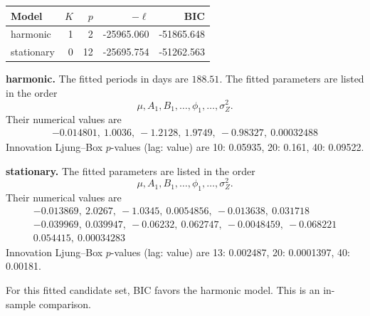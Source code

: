 \begin{center}\begin{tabular}{lrrrr}
Model & $K$ & $p$ & $-\ell$ & BIC\\\hline
harmonic & 1 & 2 & -25965.060 & -51865.648\\
stationary & 0 & 12 & -25695.754 & -51262.563\\
\end{tabular}\end{center}
\noindent\textbf{harmonic.} 
The fitted periods in days are $188.51$. 
The fitted parameters are listed in the order
\[\mu,A_1,B_1,\ldots,\phi_1,\ldots,\sigma_Z^2.\]
Their numerical values are
\[\begin{gathered}-0.014801,\ 1.0036,\ -1.2128,\ 1.9749,\ -0.98327,\ 0.00032488\end{gathered}\]
Innovation Ljung--Box $p$-values (lag: value) are 10: 0.05935, 20: 0.161, 40: 0.09522.\par
\noindent\textbf{stationary.} 
The fitted parameters are listed in the order
\[\mu,A_1,B_1,\ldots,\phi_1,\ldots,\sigma_Z^2.\]
Their numerical values are
\[\begin{gathered}-0.013869,\ 2.0267,\ -1.0345,\ 0.0054856,\ -0.013638,\ 0.031718\\-0.039969,\ 0.039947,\ -0.06232,\ 0.062747,\ -0.0048459,\ -0.068221\\0.054415,\ 0.00034283\end{gathered}\]
Innovation Ljung--Box $p$-values (lag: value) are 13: 0.002487, 20: 0.0001397, 40: 0.00181.\par
For this fitted candidate set, BIC favors the harmonic model. This is an in-sample comparison.\par